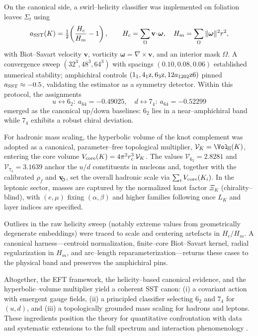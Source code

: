 \documentclass[preprint,titlepage]{revtex4-2}
\newcommand{\rhof}{\rho_{\!f}}      %
\newcommand{\swirlarrow}{\!\!\scriptsize\boldsymbol{\circlearrowleft}}
\newcommand{\vswirl}{\mathbf{v}_{\swirlarrow}}
\begin{document}
    On the canonical side, a swirl–helicity classifier was implemented on foliation leaves \(\Sigma_t\) using
    \[
        a_{\rm SST}(K)=\tfrac12\!\left(\frac{H_c}{H_m}-1\right),\qquad
        H_c=\sum_{\Omega}\mathbf v\!\cdot\!\boldsymbol\omega,\quad
        H_m=\sum_{\Omega}\|\boldsymbol\omega\|^2 r^2,
    \]
    with Biot–Savart velocity \(\mathbf v\), vorticity \(\boldsymbol\omega=\nabla\times\mathbf v\), and an interior mask \(\Omega\). A convergence sweep \((32^3,48^3,64^3)\) with spacings \((0.10,0.08,0.06)\) established numerical stability; amphichiral controls \((1_1,4_1{\rm z},6_3{\rm z},12a_{1202}{\rm z6})\) pinned \(a_{\rm SST}\approx-0.5\), validating the estimator as a symmetry detector. Within this protocol, the assignments
    \[
        u \leftrightarrow 6_2:\ a_{64}=-0.49025,\quad
        d \leftrightarrow 7_4:\ a_{64}=-0.52299
    \]
    emerged as the canonical up/down baselines: \(6_2\) lies in a near–amphichiral band while \(7_4\) exhibits a robust chiral deviation.

    For hadronic mass scaling, the hyperbolic volume of the knot complement was adopted as a canonical, parameter–free topological multiplier,
    \(\mathcal{V}_K=\Vol_{\!\mathbb{H}}(K)\), entering the core volume \(V_{\rm core}(K)=4\pi^2 r_c^3\,\mathcal{V}_K\).
    The values \(\mathcal{V}_{6_2}=2.8281\) and \(\mathcal{V}_{7_4}=3.1639\) anchor the \(u/d\) constituents in nucleons and, together with the calibrated \(\rhof\) and \(\vswirl\), set the overall hadronic scale via \(\sum_i V_{\rm core}(K_i)\).
    In the leptonic sector, masses are captured by the normalized knot factor \(\Xi_K\) (chirality–blind), with \((e,\mu)\) fixing \((\alpha,\beta)\) and higher families following once \(L_K\) and layer indices are specified.

    Outliers in the raw helicity sweep (notably extreme values from geometrically degenerate embeddings) were traced to scale and centering artefacts in \(H_c/H_m\). A canonical harness—centroid normalization, finite–core Biot–Savart kernel, radial regularization in \(H_m\), and arc–length reparameterization—returns these cases to the physical band and preserves the amphichiral pins.

    Altogether, the EFT framework, the helicity–based canonical evidence, and the hyperbolic–volume multiplier yield a coherent SST canon: (i) a covariant action with emergent gauge fields, (ii) a principled classifier selecting \(6_2\) and \(7_4\) for \((u,d)\), and (iii) a topologically grounded mass scaling for hadrons and leptons. These ingredients position the theory for quantitative confrontation with data and systematic extensions to the full spectrum and interaction phenomenology \cite{Barcelo2011,Volovik2003,Faddeev1997,Arnold1998}.
\end{document}
